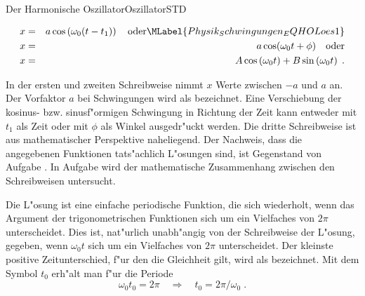\begin{MXContent}{Der Harmonische Oszillator}{Oszillator}{STD}
\begin{MInfo}
\begin{eqnarray}
  x &=& a\cos\left(\omega_0(t-t_1)\right)\quad\mathrm{oder}\MLabel{Physik_Schwingungen_EQHOLoes1}\\
  x &=& a\cos(\omega_0t+\phi)\quad\mathrm{oder}\\
  x &=& A\cos\left(\omega_0t\right)+B\sin\left(\omega_0t\right)\; .
\end{eqnarray}

\end{MInfo}

In der ersten und zweiten Schreibweise nimmt $x$ Werte zwischen $-a$ und $a$ an. Der Vorfaktor $a$ bei Schwingungen wird als  bezeichnet. Eine Verschiebung der kosinus- bzw. sinusf"ormigen Schwingung in Richtung der Zeit kann entweder mit $t_1$ als Zeit oder mit $\phi$ als Winkel ausgedr"uckt werden. Die dritte Schreibweise ist aus mathematischer Perspektive naheliegend. Der Nachweis, dass die angegebenen Funktionen tats"achlich L"osungen sind, ist Gegenstand von Aufgabe 
.
In Aufgabe
wird der mathematische Zusammenhang zwischen den Schreibweisen untersucht.

Die L"osung ist eine einfache periodische Funktion, die sich wiederholt, wenn das Argument der trigonometrischen Funktionen sich um ein Vielfaches von $2\pi$ unterscheidet. Dies ist, nat"urlich unabh"angig von der Schreibweise der L"osung, gegeben, wenn $\omega_0t$ sich um ein Vielfaches von $2\pi$ unterscheidet. Der kleinste positive Zeitunterschied, f"ur den die Gleichheit gilt, wird als  bezeichnet. Mit dem Symbol $t_0$ erh"alt man f"ur die Periode 
\begin{equation}
  \omega_0t_0 = 2\pi\quad
  \Rightarrow \quad t_0=2\pi/\omega_0\; .
\end{equation}


\end{MXContent}
